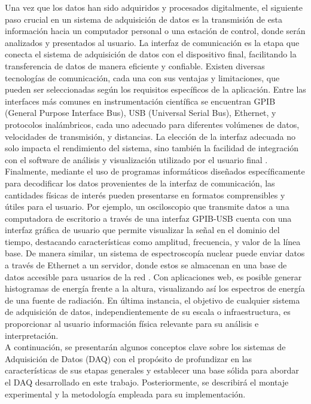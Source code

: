 \documentclass[]{book}
\begin{document}
\noindent Una vez que los datos han sido adquiridos y procesados digitalmente, el siguiente paso crucial en un sistema de adquisición de datos es la transmisión de esta información hacia un computador personal o una estación de control, donde serán analizados y presentados al usuario. La interfaz de comunicación es la etapa que conecta el sistema de adquisición de datos con el dispositivo final, facilitando la transferencia de datos de manera eficiente y confiable. Existen diversas tecnologías de comunicación, cada una con sus ventajas y limitaciones, que pueden ser seleccionadas según los requisitos específicos de la aplicación. Entre las interfaces más comunes en instrumentación científica se encuentran GPIB (General Purpose Interface Bus), USB (Universal Serial Bus), Ethernet, y protocolos inalámbricos, cada uno adecuado para diferentes volúmenes de datos, velocidades de transmisión, y distancias. La elección de la interfaz adecuada no solo impacta el rendimiento del sistema, sino también la facilidad de integración con el software de análisis y visualización utilizado por el usuario final \cite{austerlitz2014data}.\\

\noindent Finalmente, mediante el uso de programas informáticos diseñados específicamente para decodificar los datos provenientes de la interfaz de comunicación, las cantidades físicas de interés pueden presentarse en formatos comprensibles y útiles para el usuario. Por ejemplo, un osciloscopio que transmite datos a una computadora de escritorio a través de una interfaz GPIB-USB cuenta con una interfaz gráfica de usuario que permite visualizar la señal en el dominio del tiempo, destacando características como amplitud, frecuencia, y valor de la línea base. De manera similar, un sistema de espectroscopía nuclear puede enviar datos a través de Ethernet a un servidor, donde estos se almacenan en una base de datos accesible para usuarios de la red \cite{crespo2021remote}. Con aplicaciones web, es posible generar histogramas de energía frente a la altura, visualizando así los espectros de energía de una fuente de radiación. En última instancia, el objetivo de cualquier sistema de adquisición de datos, independientemente de su escala o infraestructura, es proporcionar al usuario información física relevante para su análisis e interpretación.\\

\noindent A continuación, se presentarán algunos conceptos clave sobre los sistemas de Adquisición de Datos (DAQ) con el propósito de profundizar en las características de sus etapas generales y establecer una base sólida para abordar el DAQ desarrollado en este trabajo. Posteriormente, se describirá el montaje experimental y la metodología empleada para su implementación.\\
\end{document}
